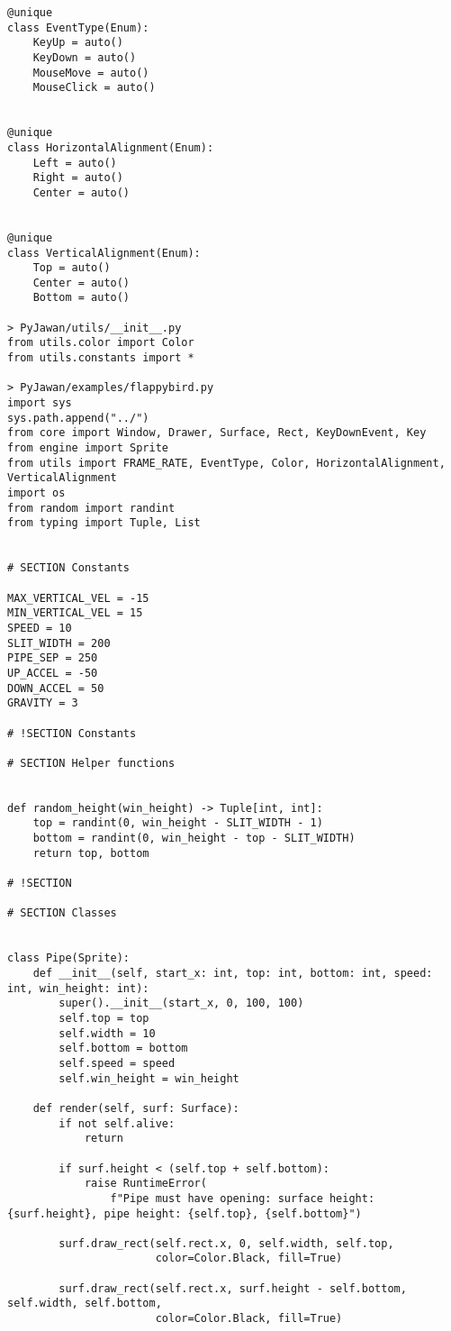 \documentclass[11pt]{article}
\begin{document}
\begin{lstlisting}
@unique
class EventType(Enum):
    KeyUp = auto()
    KeyDown = auto()
    MouseMove = auto()
    MouseClick = auto()


@unique
class HorizontalAlignment(Enum):
    Left = auto()
    Right = auto()
    Center = auto()


@unique
class VerticalAlignment(Enum):
    Top = auto()
    Center = auto()
    Bottom = auto()

> PyJawan/utils/__init__.py
from utils.color import Color
from utils.constants import *

> PyJawan/examples/flappybird.py
import sys
sys.path.append("../")
from core import Window, Drawer, Surface, Rect, KeyDownEvent, Key
from engine import Sprite
from utils import FRAME_RATE, EventType, Color, HorizontalAlignment, VerticalAlignment
import os
from random import randint
from typing import Tuple, List


# SECTION Constants

MAX_VERTICAL_VEL = -15
MIN_VERTICAL_VEL = 15
SPEED = 10
SLIT_WIDTH = 200
PIPE_SEP = 250
UP_ACCEL = -50
DOWN_ACCEL = 50
GRAVITY = 3

# !SECTION Constants

# SECTION Helper functions


def random_height(win_height) -> Tuple[int, int]:
    top = randint(0, win_height - SLIT_WIDTH - 1)
    bottom = randint(0, win_height - top - SLIT_WIDTH)
    return top, bottom

# !SECTION

# SECTION Classes


class Pipe(Sprite):
    def __init__(self, start_x: int, top: int, bottom: int, speed: int, win_height: int):
        super().__init__(start_x, 0, 100, 100)
        self.top = top
        self.width = 10
        self.bottom = bottom
        self.speed = speed
        self.win_height = win_height

    def render(self, surf: Surface):
        if not self.alive:
            return

        if surf.height < (self.top + self.bottom):
            raise RuntimeError(
                f"Pipe must have opening: surface height: {surf.height}, pipe height: {self.top}, {self.bottom}")

        surf.draw_rect(self.rect.x, 0, self.width, self.top,
                       color=Color.Black, fill=True)

        surf.draw_rect(self.rect.x, surf.height - self.bottom, self.width, self.bottom,
                       color=Color.Black, fill=True)


\end{lstlisting}
\end{document}

